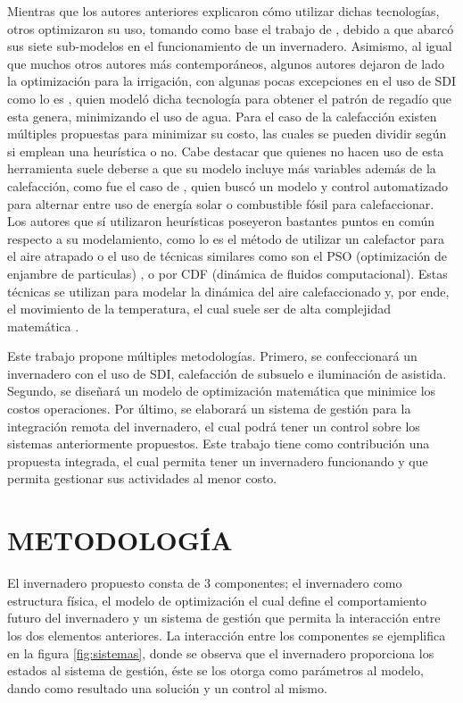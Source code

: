 \documentclass[letterpaper,conference]{IEEEtran}
\begin{document}
Mientras que los autores anteriores explicaron cómo utilizar dichas tecnologías, otros optimizaron su uso, tomando como base el trabajo de \parencite{Gijzen1998}, debido a que abarcó sus siete sub-modelos en el funcionamiento de un invernadero. Asimismo, al igual que muchos otros autores más contemporáneos, algunos autores dejaron de lado la optimización para la irrigación, con algunas pocas excepciones en el uso de SDI como lo es \parencite{Kandelous2010}, quien modeló dicha tecnología para obtener el patrón de regadío que esta genera, minimizando el uso de agua. Para el caso de la calefacción existen múltiples propuestas para minimizar su costo, las cuales se pueden dividir según si emplean una heurística o no. Cabe destacar que quienes no hacen uso de esta herramienta suele deberse a que su modelo incluye más variables además de la calefacción, como fue el caso de \parencite{Kiyan2013}, quien buscó un modelo y control automatizado para alternar entre uso de energía solar o combustible fósil para calefaccionar. Los autores que sí utilizaron heurísticas poseyeron bastantes puntos en común respecto a su modelamiento, como lo es el método de utilizar un calefactor para el aire atrapado o el uso de técnicas similares como son el PSO (optimización de enjambre de particulas) \parencite{Hasni2011,Chen2018}, o por CDF (dinámica de fluidos computacional). Estas técnicas se utilizan para modelar la dinámica del aire calefaccionado y, por ende, el movimiento de la temperatura, el cual suele ser de alta complejidad matemática \parencite{Singhal2017}.

Este trabajo propone múltiples metodologías. Primero, se confeccionará un invernadero con el uso de SDI, calefacción de subsuelo e iluminación de asistida. Segundo, se diseñará un modelo de optimización matemática que minimice los costos operaciones. Por último, se elaborará un sistema de gestión para la integración remota del invernadero, el cual podrá tener un control sobre los sistemas anteriormente propuestos. Este trabajo tiene como contribución una propuesta integrada, el cual permita tener un invernadero funcionando y que permita gestionar sus actividades al menor costo.



\section{METODOLOGÍA}


	El invernadero propuesto consta de 3 componentes; el invernadero como estructura física, el modelo de optimización el cual define el comportamiento futuro del invernadero y un sistema de gestión que permita la interacción entre los dos elementos anteriores. La interacción entre los componentes se ejemplifica en la figura \ref{fig:sistemas}, donde se observa que el invernadero proporciona los estados al sistema de gestión, éste se los otorga como parámetros al modelo, dando como resultado una solución y un control al mismo.
\end{document}
